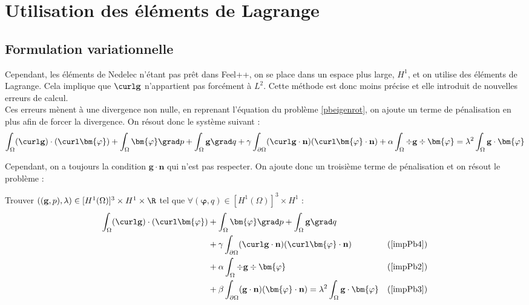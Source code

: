 \section{Utilisation des éléments de Lagrange}
\subsection{Formulation variationnelle}
Cependant, les éléments de Nedelec n'étant pas prêt dans Feel++, on se place dans un espace plus large, $H^1$, et on utilise des éléments de Lagrange. Cela implique que $\curl\mathbf{g}$ n'appartient pas forcément à $L^2$. Cette méthode est donc moins précise et elle introduit de nouvelles erreurs de calcul.\\

Ces erreurs mènent à une divergence non nulle, en reprenant l'équation du problème \ref{pbeigenrot}, on ajoute un terme de pénalisation en plus afin de forcer la divergence. On résout donc le système suivant :
\[ \int_\Omega (\curl\mathbf{g})\cdot(\curl\bm{\varphi}) + \int_\Omega\bm{\varphi}\grad p + \int_\Omega \mathbf{g}\grad q + \gamma\int_{\partial\Omega}(\curl\mathbf{g}\cdot\mathbf{n})(\curl\bm{\varphi}\cdot\mathbf{n}) + \alpha\int_\Omega \div\mathbf{g}\div\bm{\varphi} = \lambda^2\int_\Omega \mathbf{g}\cdot\bm{\varphi} \]

Cependant, on a toujours la condition $\mathbf{g}\cdot\mathbf{n}$ qui n'est pas respecter. On ajoute donc un troisième terme de pénalisation et on résout le problème :
\begin{pb}\label{pbeigenh1}
Trouver $((\mathbf{g},p),\lambda)\in [H^1(\Omega)]^3\times H^1 \times \R$ tel que $\forall (\bm{\varphi},q)\in [H^1(\Omega)]^3\times H^1$ :
\begin{align*}
\int_\Omega (\curl\mathbf{g})\cdot(\curl\bm{\varphi}) &+ \int_\Omega\bm{\varphi}\grad p + \int_\Omega \mathbf{g}\grad q & \\
&+ \gamma\int_{\partial\Omega}(\curl\mathbf{g}\cdot\mathbf{n})(\curl\bm{\varphi}\cdot\mathbf{n}) & (\ref{impPb4})\\
& + \alpha\int_\Omega \div\mathbf{g}\div\bm{\varphi} & (\ref{impPb2})\\
&+ \beta\int_{\partial\Omega}(\mathbf{g}\cdot\mathbf{n})(\bm{\varphi}\cdot\mathbf{n})  = \lambda^2\int_\Omega \mathbf{g}\cdot\bm{\varphi} & (\ref{impPb3})
\end{align*} \end{pb}

